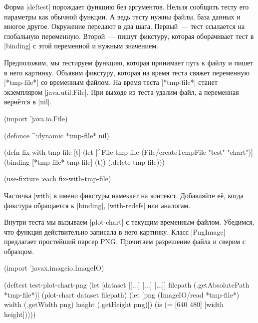 Форма \spverb|deftest| порождает функцию без аргументов. Нельзя сообщить тесту
его параметры как обычной функции. А ведь тесту нужны файлы, база данных и
многое другое. Окружение передают в два шага. Первый~--- тест ссылается на
глобальную переменную. Второй~--- пишут фикстуру, которая оборачивает тест в
\spverb|binding| с этой переменной и нужным значением.

Предположим, мы тестируем функцию, которая принимает путь к файлу и пишет в него
картинку. Объявим фикстуру, которая на время теста свяжет переменную
\spverb|*tmp-file*| со временным файлом. На время теста \spverb|*tmp-file*|
станет экземпляром \spverb|java.util.File|. При выходе из теста удалим файл, а
переменная верн\"{е}тся в \spverb|nil|.


\begin{english}
  \begin{clojure}
(import 'java.io.File)

(defonce ^:dynamic *tmp-file* nil)

(defn fix-with-tmp-file [t]
  (let [^File tmp-file (File/createTempFile "test" "chart")]
    (binding [*tmp-file* tmp-file]
      (t))
    (.delete tmp-file)))

(use-fixture :each fix-with-tmp-file)
  \end{clojure}
\end{english}

Частичка \spverb|with| в имени фикстуры намекает на контекст. Добавляйте е\"{е},
когда фикстура обращается к \spverb|binding|, \spverb|with-redefs| или аналогам.


Внутри теста мы вызываем \spverb|plot-chart| с текущим временным
файлом. Убедимся, что функция действительно записала в него картинку. Класс
\spverb|PngImage| предлагает простейший парсер PNG. Прочитаем разрешение файла и
сверим с образцом.

\begin{english}
  \begin{clojure}
(import 'javax.imageio.ImageIO)

(deftest test-plot-chart-png
  (let [dataset [[...] [...] [...]]
        filepath (.getAbsolutePath *tmp-file*)]
    (plot-chart dataset filepath)
    (let [png (ImageIO/read *tmp-file*)
          width (.getWidth png)
          height (.getHeight png)])
    (is (= [640 480] [width height]))))
  \end{clojure}
\end{english}

